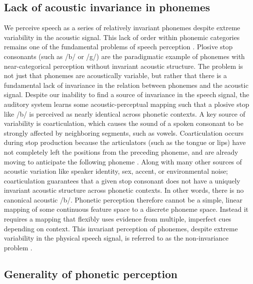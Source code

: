 \subsection{Lack of acoustic invariance in phonemes}

We perceive speech as a series of relatively invariant phonemes despite extreme variability in the acoustic signal. This lack of order within phonemic categories remains one of the fundamental problems of speech perception \cite{Sussman1998}. Plosive stop consonants (such as /b/ or /g/) are the paradigmatic example of phonemes with near-categorical perception\cite{Holt2010,Kronrod2016a,LIBERMAN1957} without invariant acoustic structure\cite{Elman1988,Kluender1987}. The problem is not just that phonemes are acoustically variable, but rather that there is a fundamental lack of invariance in the relation between phonemes and the acoustic signal\cite{Kluender1987}. Despite our inability to find a source of invariance in the speech signal, the auditory system learns some acoustic-perceptual mapping such that a plosive stop like /b/ is perceived as nearly identical across phonetic contexts. A key source of variability is coarticulation, which causes the sound of a spoken consonant to be strongly affected by neighboring segments, such as vowels. Coarticulation occurs during stop production because the articulators (such as the tongue or lips) have not completely left the positions from the preceding phoneme, and are already moving to anticipate the following phoneme \cite{Liberman1967,Farnetani1990}.  Along with many other sources of acoustic variation like speaker identity, sex, accent, or environmental noise; coarticulation guarantees that a given stop consonant does not have a uniquely invariant acoustic structure across phonetic contexts. In other words, there is no canonical acoustic /b/\cite{Liberman1967,Holt2010}. Phonetic perception therefore cannot be a simple, linear mapping of some continuous feature space to a discrete phoneme space. Instead it requires a mapping that flexibly uses evidence from multiple, imperfect cues depending on context\cite{Holt2010, Diehl2004}. This invariant perception of phonemes, despite extreme variability in the physical speech signal, is referred to as the non-invariance problem \cite{Perkell1986}.

\subsection{Generality of phonetic perception}

